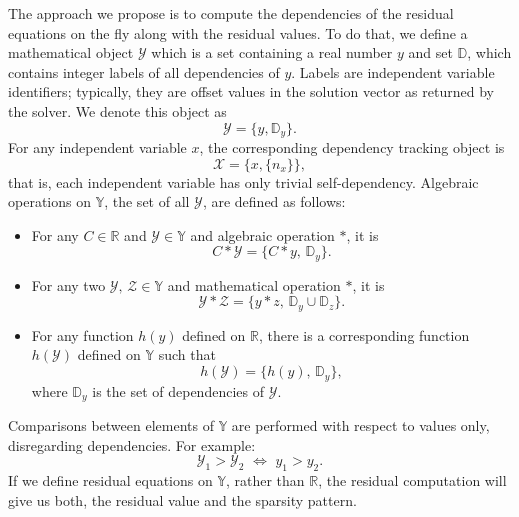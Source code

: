 \documentclass[10pt]{ijnam}
\theoremstyle{definition}
\begin{document}
The approach we propose is to compute the dependencies of the residual equations on the fly along with the
residual values. To do that, we
define a mathematical object $\mathcal{Y}$ which is a set containing a real number 
$y$ and set $\mathbb{D}$, which contains integer labels of all dependencies of $y$. 
Labels are independent variable identifiers; typically, they are offset values in the 
solution vector as returned by the solver. We denote this object as
\begin{equation}
    \mathcal{Y} = \{y, \mathbb{D}_y\}. \label{eq:dependency_tracking}
\end{equation}
For any independent variable $x$, the corresponding dependency tracking object is
\begin{equation}
    \mathcal{X} = \{x, \{n_x \} \},
\end{equation}
that is, each independent variable has only trivial self-dependency. Algebraic 
operations on $\mathbb{Y}$, the set of all $\mathcal{Y}$, are defined as follows:
\begin{itemize}[leftmargin=1em]
\item For any $C \in \mathbb{R}$ and $\mathcal{Y} \in \mathbb{Y}$ and algebraic operation 
$*$, it is
\begin{equation}
    C * \mathcal{Y} = \{ C * y, \, \mathbb{D}_y \}.
\end{equation} 
\item For any two $\mathcal{Y}, \, \mathcal{Z} \in \mathbb{Y}$ and mathematical operation 
$*$, it is
\begin{equation}
    \mathcal{Y} * \mathcal{Z} = \{ y * z, \, \mathbb{D}_y \cup \mathbb{D}_z \}.
\end{equation}
\item For any function $h(y)$ defined on $\mathbb{R}$, there is a corresponding function 
$h(\mathcal{Y})$ defined on $\mathbb{Y}$ such that
\begin{equation}
    h(\mathcal{Y}) = \{ h(y), \, \mathbb{D}_y \},
\end{equation}
where $\mathbb{D}_y$ is the set of dependencies of $\mathcal{Y}$.
\end{itemize}
Comparisons between elements of $\mathbb{Y}$ are performed with respect to values 
only, disregarding dependencies. For example:
\begin{equation}
    \mathcal{Y}_1 > \mathcal{Y}_2 \,\, \Leftrightarrow \,\, y_1 > y_2.
\end{equation}
If we define residual equations on $\mathbb{Y}$, rather than $\mathbb{R}$, the 
residual computation will give us both, the residual value and the sparsity pattern.
\end{document}

